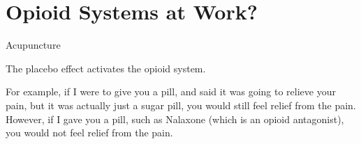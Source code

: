 \section{Opioid Systems at Work?}

\begin{coloredlist}
    \item Acupuncture
    \begin{coloredlist}
        \item 
    \end{coloredlist}
    \item The placebo effect activates the opioid system.
    \item For example, if I were to give you a pill, and said it was going to relieve your pain, but it was actually just a sugar pill, you would still feel relief from the pain. However, if I gave you a pill, such as Nalaxone (which is an opioid antagonist), you would not feel relief from the pain. 
\end{coloredlist}